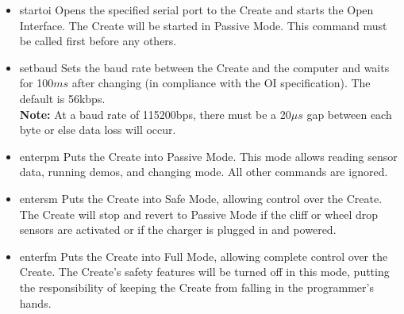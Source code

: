 \documentclass {article}
\begin{document}
\begin {itemize}
  \item {} {startoi}
        Opens the specified serial port to the Create and starts the Open Interface.  The Create
        will be started in Passive Mode.  This command must be called first before any others. \\
        \retnorm
 
  \item {} {setbaud}
        Sets the baud rate between the Create and the computer and waits for 100$ms$ after changing
        (in compliance with the OI specification).  The default is 56kbps. \\
        {\bf Note:}  At a baud rate of 115200bps, there must be a 20$\mu s$ gap between each byte
        or else data loss will occur. \\
        \retnorm

  \item {} {enterpm}
        Puts the Create into Passive Mode.  This mode allows reading sensor data, running demos, and
        changing mode.  All other commands are ignored. \\ 
        \retnorm

  \item {} {entersm}
        Puts the Create into Safe Mode, allowing control over the Create.  The Create will stop and
        revert to Passive Mode if the cliff or wheel drop sensors are activated or if the charger is
        plugged in and powered. \\
        \retnorm

  \item {} {enterfm}
        Puts the Create into Full Mode, allowing complete control over the Create.  The Create's
        safety features will be turned off in this mode, putting the responsibility of keeping the
        Create from falling in the programmer's hands. \\
        \retnorm


\end{itemize}
\end{document}
